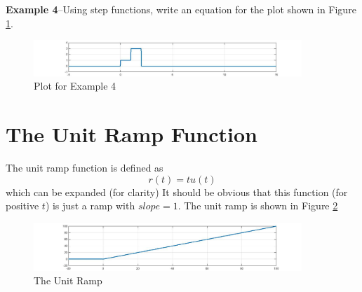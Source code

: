 \documentclass{handout}
\begin{document}
\newpage
\clearpage
\pagebreak

\textbf{Example 4}--Using step functions, write an equation for the plot shown in Figure \ref{fig: Example4}.
\begin{figure} [h!]
\centering
\includegraphics[width=0.9\textwidth]{Example4.jpg}
\caption{Plot for Example 4}
\label{fig: Example4}
\end{figure}


\newpage
\clearpage
\pagebreak

\section{The Unit Ramp Function}
The unit ramp function is defined as
\begin{equation}
r(t) = tu(t)
\end{equation}
which can be expanded (for clarity)
It should be obvious that this function (for positive $t$) is just a ramp with $slope=1$. The unit ramp is shown in Figure \ref{fig: Ramp}
\begin{figure} [h!]
\centering
\includegraphics[width=0.9\textwidth]{ramp.jpg}
\caption{The Unit Ramp}
\label{fig: Ramp}
\end{figure}
\end{document}
